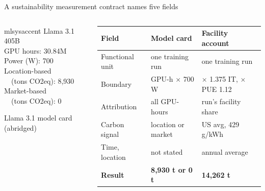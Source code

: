 \documentclass[aspectratio=169, 12pt]{beamer}
\begin{document}
\begin{frame}{A sustainability measurement contract names five fields}
  \begin{columns}[c]
    \begin{column}{0.38\textwidth}
      \begin{mlsyscard}{mlsysaccent}\footnotesize\ttfamily
        Llama 3.1 405B\\[0.05cm]
        GPU hours: 30.84M\\
        Power (W): 700\\
        Location-based\\
        \ \ (tons CO2eq): 8,930\\
        Market-based\\
        \ \ (tons CO2eq): 0
      \end{mlsyscard}
      {\footnotesize\textcolor{midgray}{Llama 3.1 model card (abridged)}}
    \end{column}
    \begin{column}{0.60\textwidth}\footnotesize
      \setlength{\tabcolsep}{3.5pt}
      \renewcommand{\arraystretch}{1.1}
      \begin{tabular}{@{}P{2.2cm}P{2.35cm}P{3.15cm}@{}}\toprule
        \textbf{Field} & \textbf{Model card} & \textbf{Facility account} \\\midrule
        Functional unit & one training run & one training run \\
        Boundary & GPU-h $\times$ 700 W & $\times$ 1.375 IT, $\times$ PUE 1.12 \\
        Attribution & all GPU-hours & run's facility share \\
        Carbon signal & location or market & US avg, 429 g/kWh \\
        Time, location & not stated & annual average \\\midrule
        \textbf{Result} & \textbf{8,930 t or 0 t} & \textbf{14,262 t} \\\bottomrule
      \end{tabular}
    \end{column}
  \end{columns}
\end{frame}
\end{document}
